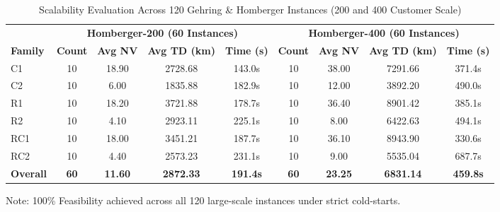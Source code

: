 \begin{table}[htbp]
\centering
\caption{Scalability Evaluation Across 120 Gehring \& Homberger Instances (200 and 400 Customer Scale)}
\label{tab:homberger_scalability}
\begin{tabular}{l|cccc|cccc}
\toprule
& \multicolumn{4}{c|}{\textbf{Homberger-200 (60 Instances)}} & \multicolumn{4}{c}{\textbf{Homberger-400 (60 Instances)}} \\
\textbf{Family} & \textbf{Count} & \textbf{Avg NV} & \textbf{Avg TD (km)} & \textbf{Time (s)} & \textbf{Count} & \textbf{Avg NV} & \textbf{Avg TD (km)} & \textbf{Time (s)} \\
\midrule
C1 & 10 & 18.90 & 2728.68 & 143.0s & 10 & 38.00 & 7291.66 & 371.4s \\
C2 & 10 & 6.00 & 1835.88 & 182.9s & 10 & 12.00 & 3892.20 & 490.0s \\
R1 & 10 & 18.20 & 3721.88 & 178.7s & 10 & 36.40 & 8901.42 & 385.1s \\
R2 & 10 & 4.10 & 2923.11 & 225.1s & 10 & 8.00 & 6422.63 & 494.1s \\
RC1 & 10 & 18.00 & 3451.21 & 187.7s & 10 & 36.10 & 8943.90 & 330.6s \\
RC2 & 10 & 4.40 & 2573.23 & 231.1s & 10 & 9.00 & 5535.04 & 687.7s \\
\midrule
\textbf{Overall} & \textbf{60} & \textbf{11.60} & \textbf{2872.33} & \textbf{191.4s} & \textbf{60} & \textbf{23.25} & \textbf{6831.14} & \textbf{459.8s} \\
\bottomrule
\end{tabular}
\begin{tablenotes}
\small
\item Note: 100\% Feasibility achieved across all 120 large-scale instances under strict cold-starts.
\end{tablenotes}
\end{table}
